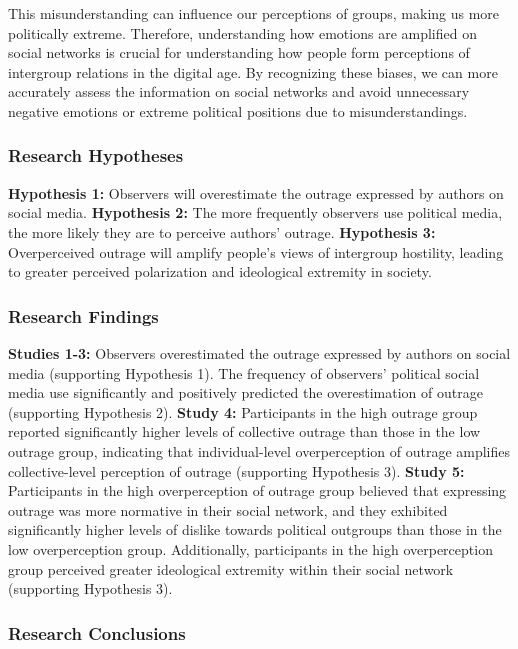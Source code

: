 \documentclass[
  man]{apa6}
\begin{document}
This misunderstanding can influence our perceptions of groups, making us more politically extreme. Therefore, understanding how emotions are amplified on social networks is crucial for understanding how people form perceptions of intergroup relations in the digital age. By recognizing these biases, we can more accurately assess the information on social networks and avoid unnecessary negative emotions or extreme political positions due to misunderstandings.

\hypertarget{research-hypotheses}{%
\subsubsection{Research Hypotheses}\label{research-hypotheses}}

\textbf{Hypothesis 1:} Observers will overestimate the outrage expressed by authors on social media.
\textbf{Hypothesis 2:} The more frequently observers use political media, the more likely they are to perceive authors' outrage.
\textbf{Hypothesis 3:} Overperceived outrage will amplify people's views of intergroup hostility, leading to greater perceived polarization and ideological extremity in society.

\hypertarget{research-findings}{%
\subsubsection{Research Findings}\label{research-findings}}

\textbf{Studies 1-3:} Observers overestimated the outrage expressed by authors on social media (supporting Hypothesis 1). The frequency of observers' political social media use significantly and positively predicted the overestimation of outrage (supporting Hypothesis 2).
\textbf{Study 4:} Participants in the high outrage group reported significantly higher levels of collective outrage than those in the low outrage group, indicating that individual-level overperception of outrage amplifies collective-level perception of outrage (supporting Hypothesis 3).
\textbf{Study 5:} Participants in the high overperception of outrage group believed that expressing outrage was more normative in their social network, and they exhibited significantly higher levels of dislike towards political outgroups than those in the low overperception group. Additionally, participants in the high overperception group perceived greater ideological extremity within their social network (supporting Hypothesis 3).

\hypertarget{research-conclusions}{%
\subsubsection{Research Conclusions}\label{research-conclusions}}
\end{document}

